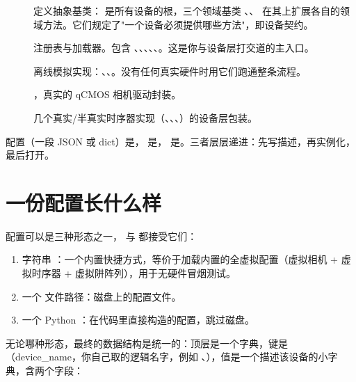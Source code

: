 \documentclass[11pt,oneside,openany]{book}
\begin{document}
\begin{description}
\item[] 定义抽象基类： 是所有设备的根，三个领域基类 、、 在其上扩展各自的领域方法。它们规定了"一个设备必须提供哪些方法"，即设备契约。
\item[] 注册表与加载器。包含 、、、、、。这是你与设备层打交道的主入口。
\item[] 离线模拟实现：、、。没有任何真实硬件时用它们跑通整条流程。
\item[] ，真实的 qCMOS 相机驱动封装。
\item[] 几个真实/半真实时序器实现（、、、）的设备层包装。
\end{description}

\begin{notebox}[心智模型]
配置（一段 JSON 或 dict）是， 是， 是。三者层层递进：先写描述，再实例化，最后打开。
\end{notebox}

\section{一份配置长什么样}

配置可以是三种形态之一， 与  都接受它们：

\begin{enumerate}
\item 字符串 ：一个内置快捷方式，等价于加载内置的全虚拟配置（虚拟相机 + 虚拟时序器 + 虚拟阱阵列），用于无硬件冒烟测试。
\item 一个  文件路径：磁盘上的配置文件。
\item 一个 Python ：在代码里直接构造的配置，跳过磁盘。
\end{enumerate}

无论哪种形态，最终的数据结构是统一的：顶层是一个字典，键是（device\_name，你自己取的逻辑名字，例如 、），值是一个描述该设备的小字典，含两个字段：
\end{document}
